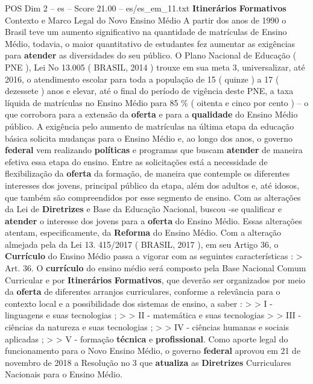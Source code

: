 \begin{textsample}{POS Dim 2 – es – Score 21.00 – es/es\_em\_11.txt}  \label{ex:f2_pos_216}
\textbf{Itinerários} \textbf{Formativos} Contexto e Marco Legal do Novo Ensino Médio A partir dos anos de 1990 o Brasil teve um aumento significativo na quantidade de matrículas de Ensino Médio, todavia, o maior quantitativo de estudantes fez aumentar as exigências para \textbf{atender} as diversidades do seu público.
O Plano Nacional de Educação ( PNE ), Lei No 13.005 ( BRASIL, 2014 ) trouxe em sua meta 3, universalizar, até 2016, o atendimento escolar para toda a população de 15 ( quinze ) a 17 ( dezessete ) anos e elevar, até o final do período de vigência deste PNE, a taxa líquida de matrículas no Ensino Médio para 85 \% ( oitenta e cinco por cento ) – o que corrobora para a extensão da \textbf{oferta} e para a \textbf{qualidade} do Ensino Médio público.
A exigência pelo aumento de matrículas na última etapa da educação básica solicita mudanças para o Ensino Médio e, ao longo dos anos, o governo \textbf{federal} vem realizando \textbf{políticas} e programas que buscam \textbf{atender} de maneira efetiva essa etapa do ensino.
Entre as solicitações está a necessidade de flexibilização da \textbf{oferta} da formação, de maneira que contemple os diferentes interesses dos jovens, principal público da etapa, além dos adultos e, até idosos, que também são compreendidos por esse segmento de ensino.
Com as alterações da Lei de \textbf{Diretrizes} e Base da Educação Nacional, buscou -se qualificar e \textbf{atender} o interesse dos jovens para a \textbf{oferta} do Ensino Médio.
Essas alterações atentam, especificamente, da \textbf{Reforma} do Ensino Médio.
Com a alteração almejada pela da Lei 13. 415/2017 ( BRASIL, 2017 ), em seu Artigo 36, o \textbf{Currículo} do Ensino Médio passa a vigorar com as seguintes características : > Art. 36.
O \textbf{currículo} do ensino médio será composto pela Base Nacional Comum Curricular e por \textbf{Itinerários} \textbf{Formativos}, que deverão ser organizados por meio da \textbf{oferta} de diferentes arranjos curriculares, conforme a relevância para o contexto local e a possibilidade dos sistemas de ensino, a saber : > > I - linguagens e suas tecnologias ; > > II - matemática e suas tecnologias > > III - ciências da natureza e suas tecnologias ; > > IV - ciências humanas e sociais aplicadas ; > > V - formação \textbf{técnica} e \textbf{profissional}.
Como aporte legal do funcionamento para o Novo Ensino Médio, o governo \textbf{federal} aprovou em 21 de novembro de 2018 a Resolução no 3 que \textbf{atualiza} as \textbf{Diretrizes} Curriculares Nacionais para o Ensino Médio.

\end{textsample}
